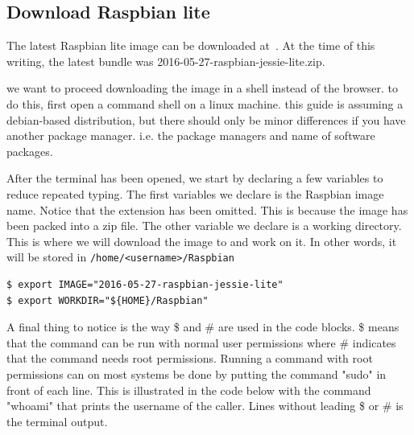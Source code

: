 \subsection{Download Raspbian lite}

The latest Raspbian lite image can be downloaded at~\cite{raspbian}.
At the time of this writing, the latest bundle was
2016-05-27-raspbian-jessie-lite.zip.

we want to proceed downloading the image in a shell instead of the browser.
to do this, first open a command shell on a linux machine. this guide is
assuming a debian-based distribution, but there should only be minor differences
if you have another package manager. i.e. the package managers and name of software packages.

After the terminal has been opened, we start by declaring a few variables to reduce
repeated typing. The first variables we declare is the Raspbian image name.
Notice that the extension has been omitted. This is because the image has been
packed into a zip file. The other variable we declare is a working directory.
This is where we will download the image to and work on it. In other words, it
will be stored in \texttt{/home/<username>/Raspbian}


\begin{lstlisting}[]
$ export IMAGE="2016-05-27-raspbian-jessie-lite"
$ export WORKDIR="${HOME}/Raspbian"
\end{lstlisting}
\FloatBarrier
\vspace{-5mm}

A final thing to notice is the way \$ and \# are used in the code blocks. \$
means that the command can be run with normal user permissions where \# indicates that the
command needs root permissions.
Running a command with root permissions can on most systems be done by putting
the command "sudo" in front of each line. This is illustrated in the code below
with the command "whoami" that prints the username of the caller. Lines without
leading \$ or \# is the terminal output.

